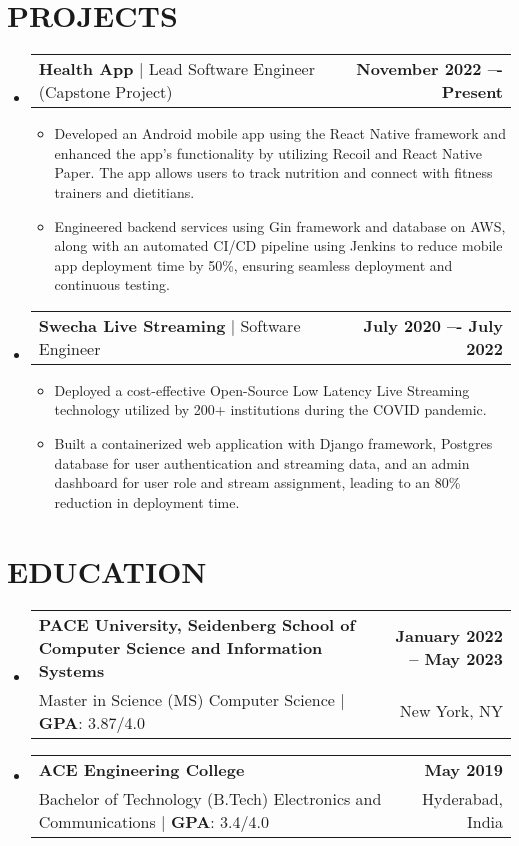 \documentclass[letterpaper,10pt]{article}
\makeatletter
\newcommand{\resumeItem}[1]{
  \item\small{
    {#1 \vspace{-2pt}}
  }
}
\newcommand{\resumeProjectHeading}[2]{
    \item
    \begin{tabular*}{1.0\textwidth}{l@{\extracolsep{\fill}}r}
      \small#1 & \textbf{\small #2}\\
    \end{tabular*}\vspace{-7pt}
}
\newcommand{\resumeSubHeadingListStart}{\begin{itemize}[leftmargin=0.0in, label={}]}
\newcommand{\resumeSubHeadingListEnd}{\end{itemize}}
\newcommand{\resumeItemListStart}{\begin{itemize}}
\newcommand{\resumeItemListEnd}{\end{itemize}\vspace{-5pt}}
\newcommand{\resumeSubheadingWithGPA}[5]{
  \vspace{-2pt}\item
    \begin{tabular*}{1.0\textwidth}[t]{l@{\extracolsep{\fill}}r}
      \textbf{#1} & \textbf{\small #2} \\
      {\small#3} $|$ {\small \textbf{GPA}: #4} & {} {\small #5}
    \end{tabular*}\vspace{-7pt}
}
\makeatother
\begin{document}
\section{PROJECTS}
    \vspace{-5pt}
    \resumeSubHeadingListStart
      \resumeProjectHeading
          {\textbf{Health App} $|$ {Lead Software Engineer (Capstone Project)}}{November 2022 –- Present}
          \resumeItemListStart
            \resumeItem{Developed an Android mobile app using the React Native framework and enhanced the app's functionality by utilizing Recoil and React Native Paper. The app allows users to track nutrition and connect with fitness trainers and dietitians.}
            \resumeItem{Engineered backend services using Gin framework and database on AWS, along with an automated CI/CD pipeline using Jenkins to reduce mobile app deployment time by 50\%, ensuring seamless deployment and continuous testing.}
          \resumeItemListEnd

      \resumeProjectHeading
          {\textbf{Swecha Live Streaming} $|$ {Software Engineer}}{July 2020 –- July 2022}
          \resumeItemListStart
            \resumeItem{Deployed a cost-effective Open-Source Low Latency Live Streaming technology utilized by 200+ institutions during the COVID pandemic.}
            \resumeItem{Built a containerized web application with Django framework, Postgres database for user authentication and streaming data, and an admin dashboard for user role and stream assignment, leading to an 80\% reduction in deployment time.}
          \resumeItemListEnd  
    \resumeSubHeadingListEnd

\section{EDUCATION}
  \resumeSubHeadingListStart
    \resumeSubheadingWithGPA
      {PACE University, Seidenberg School of Computer Science and Information Systems}{January 2022 -- May 2023}
      {Master in Science (MS) Computer Science} {3.87/4.0} {New York, NY}
      \vspace{5pt}
    \resumeSubheadingWithGPA
      {ACE Engineering College}{May 2019}
      {Bachelor of Technology (B.Tech) Electronics and Communications} {3.4/4.0} {Hyderabad, India}
  \resumeSubHeadingListEnd


\end{document}
